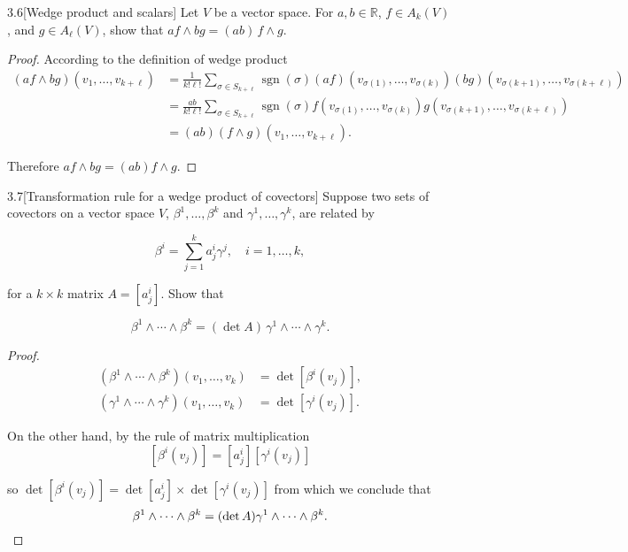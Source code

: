 \begin{problem}{3.6}[Wedge product and scalars]
Let \( V \) be a vector space. For \( a, b \in \mathbb{R} \), \( f \in A_{k}(V) \), and \( g \in A_{\ell}(V) \), show that \( a f \wedge b g = (a b) \, f \wedge g \).
\end{problem}

\begin{proof}
    According to the definition of wedge product
    \begingroup
    \allowdisplaybreaks%
    \begin{align*}
        (af \wedge bg)(v_{1}, \ldots, v_{k + \ell}) & = \frac{1}{k!\ell!}\sum_{\sigma \in S_{k + \ell}} \operatorname{sgn}(\sigma) (af)(v_{\sigma(1)}, \ldots, v_{\sigma(k)}) (bg)(v_{\sigma(k + 1)}, \ldots, v_{\sigma(k + \ell)}) \\
                                                    & = \frac{ab}{k!\ell!}\sum_{\sigma \in S_{k + \ell}} \operatorname{sgn}(\sigma) f(v_{\sigma(1)}, \ldots, v_{\sigma(k)}) g(v_{\sigma(k + 1)}, \ldots, v_{\sigma(k + \ell)})      \\
                                                    & = (ab) (f\wedge g)(v_{1}, \ldots, v_{k + \ell}).
    \end{align*}
    \endgroup

    Therefore \( af \wedge bg = (ab) f\wedge g \).
\end{proof}

\begin{problem}{3.7}[Transformation rule for a wedge product of covectors]
Suppose two sets of covectors on a vector space \( V \), \( \beta^{1}, \ldots, \beta^{k} \) and \( \gamma^{1}, \ldots, \gamma^{k} \), are related by

\[
    \beta^{i} = \sum_{j=1}^{k} a_{j}^{i} \gamma^{j}, \quad i = 1, \ldots, k,
\]

for a \( k \times k \) matrix \( A = [a_{j}^{i}] \). Show that

\[
    \beta^{1} \wedge \cdots \wedge \beta^{k} = (\det A) \, \gamma^{1} \wedge \cdots \wedge \gamma^{k}.
\]
\end{problem}

\begin{proof}
    \begingroup
    \allowdisplaybreaks%
    \begin{align*}
        (\beta^{1} \wedge \cdots \wedge \beta^{k})(v_{1}, \ldots, v_{k})   & = \det [\beta^{i}(v_{j})], \\
        (\gamma^{1} \wedge \cdots \wedge \gamma^{k})(v_{1}, \ldots, v_{k}) & = \det[\gamma^{i}(v_{j})].
    \end{align*}
    \endgroup

    On the other hand, by the rule of matrix multiplication
    \[
        [\beta^{i}(v_{j})] = [a^{i}_{j}][\gamma^{i}(v_{j})]
    \]

    so \( \det[\beta^{i}(v_{j})] = \det[a^{i}_{j}] \times \det[\gamma^{i}(v_{j})] \) from which we conclude that
    \[
        \beta^{1} \wedge \cdots \wedge \beta^{k} = (\det A) \gamma^{1} \wedge \cdots \wedge \beta^{k}.\qedhere
    \]
\end{proof}

